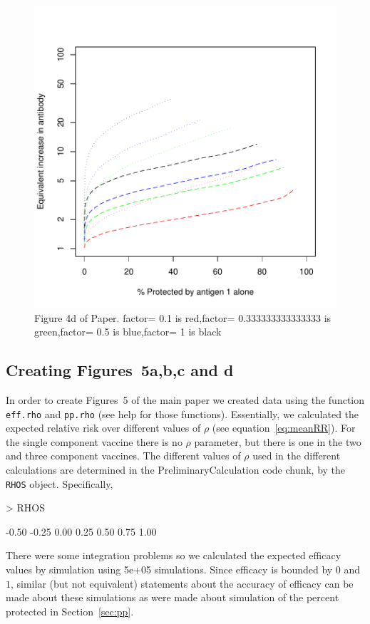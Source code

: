\documentclass{article}[12pt]
\begin{document}
\begin{figure}
\caption{Figure 4d of Paper.
factor= 0.1  is  red,factor= 0.333333333333333  is  green,factor= 0.5  is  blue,factor= 1  is  black
 \label{fig:4d} }
\includegraphics{hbimdetails-fig4d}
\end{figure}

\subsection{Creating Figures~5a,b,c and d}


In order to create Figures~5 of the main paper we created data using the function \texttt{eff.rho} and \texttt{pp.rho}
(see help for those functions). Essentially, we  calculated the expected relative risk over different values of $\rho$ 
(see equation~\ref{eq:meanRR}). For the single component vaccine there is no $\rho$ parameter, but there is one in the 
two and  three component vaccines. 
The different values of $\rho$ used in the different calculations 
are determined in the PreliminaryCalculation code chunk, by the \texttt{RHOS} object.
Specifically, 
\begin{Schunk}
\begin{Sinput}
> RHOS
\end{Sinput}
\begin{Soutput}
[1] -0.50 -0.25  0.00  0.25  0.50  0.75  1.00
\end{Soutput}
\end{Schunk}
There were some integration problems so we calculated the expected efficacy values by 
simulation using 5e+05 simulations. Since efficacy is bounded by $0$ and $1$,
similar (but not equivalent) statements about the accuracy of efficacy can be made about these simulations as were made about simulation
of the percent protected in Section~\ref{sec:pp}.
\end{document}
